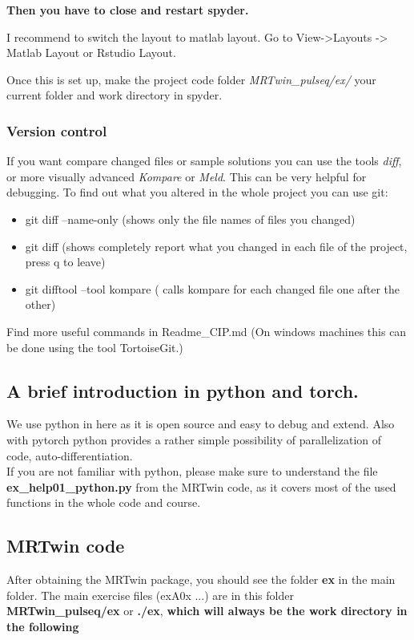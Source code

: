 \documentclass[a4paper,12pt]{extarticle}
\begin{document}
\textbf{Then you have to close and restart spyder.}

I recommend to switch the layout to matlab layout. Go to View->Layouts -> Matlab Layout or Rstudio Layout.

Once this is set up, make the project code folder \emph{MRTwin\_pulseq/ex/} your current folder and work directory in spyder. 

\subsubsection{Version control}
If you want compare changed files or sample solutions you can use the tools \emph{diff}, or more visually advanced \emph{Kompare} or \emph{Meld}. This can be very helpful for debugging.
To find out what you altered in the whole project you can use git:
\begin{itemize}
\item git diff --name-only  (shows only the file names of files you changed)
\item git diff (shows completely report what you changed in each file of the project, press q to leave)
\item git difftool --tool kompare ( calls kompare for each changed file one after the other)
\end{itemize}
Find more useful commands in Readme\_CIP.md
(On windows machines this can be done using the tool TortoiseGit.)

\subsection{A brief introduction in python and torch. }
We use python in here as it is open source and easy to debug and extend. Also with pytorch python provides a rather simple possibility of parallelization of code, auto-differentiation. \\
If you are not familiar with python, please make sure to understand the file \textbf{ex\_help01\_python.py} from the MRTwin code, as it covers most of the used functions in the whole code and course.

\subsection{MRTwin code}
After obtaining the MRTwin package, you should see the folder \textbf{ex} in the main folder.
The main exercise files (exA0x ...) are in this folder \textbf{MRTwin\_pulseq/ex} or \textbf{./ex}, \textbf{which will always be the work directory in the following} 
\end{document}
